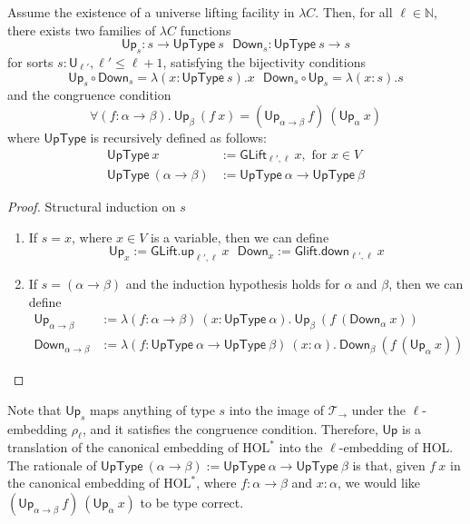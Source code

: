   \begin{theorem} Assume the existence of a universe lifting facility in $\lambda C$. Then,
    for all $\ell \in \mathbb{N}$, there exists two families of $\lambda C$ functions
    $$\mathsf{Up}_s : s \to \mathsf{UpType} \ s \ \ \ \mathsf{Down}_s : \mathsf{UpType} \ s \to s$$
    for sorts $s : \mathsf{U}_{\ell'}, \ell' \leq \ell + 1$, satisfying the bijectivity conditions
    $$\mathsf{Up}_s \circ \mathsf{Down}_s = \lambda (x : \mathsf{UpType} \ s). x \ \ \
      \mathsf{Down}_s \circ \mathsf{Up}_s = \lambda (x : s). s$$
    and the congruence condition
    $$\forall (f : \alpha \to \beta). \ \mathsf{Up}_\beta \ (f \ x) = (\mathsf{Up}_{\alpha \to \beta} \ f) \ (\mathsf{Up}_\alpha \ x)$$
    where $\mathsf{UpType}$ is recursively defined as follows:
    $$\begin{aligned}
    \mathsf{UpType} \ x & := \mathsf{GLift}_{\ell', \ell} \ x, \text{ for } x \in V \\
    \mathsf{UpType} \ (\alpha \to \beta) & := \mathsf{UpType} \ \alpha \to \mathsf{UpType} \ \beta
    \end{aligned}$$
    \begin{proof}
      Structural induction on $s$
      \begin{enumerate}
        \item If $s = x$, where $x \in V$ is a variable, then we can define
          $$\mathsf{Up}_x := \mathsf{GLift.up}_{\ell', \ell} \ x \ \ \ \mathsf{Down}_x := \mathsf{Glift.down}_{\ell', \ell} \ x$$
        \item If $s = (\alpha \to \beta)$ and the induction hypothesis holds for $\alpha$ and $\beta$, then we can define
          $$\begin{aligned}
          \mathsf{Up}_{\alpha \to \beta} &:= \lambda (f : \alpha \to \beta) \ (x : \mathsf{UpType} \ \alpha). \ \mathsf{Up}_\beta \ (f \ (\mathsf{Down}_\alpha \ x)) \\
          \mathsf{Down}_{\alpha \to \beta} &:= \lambda (f : \mathsf{UpType} \ \alpha \to \mathsf{UpType} \ \beta) \ (x : \alpha). \ \mathsf{Down}_\beta \ (f \ (\mathsf{Up}_\alpha \ x))
          \end{aligned}$$
      \end{enumerate}
    \end{proof}
  \end{theorem}

  \noindent Note that $\mathsf{Up}_s$ maps anything of type $s$ into the image of $\mathcal{T}_\to$ under
  the $\ell$-embedding $\rho_\ell$, and it satisfies the congruence condition. Therefore, $\mathsf{Up}$
  is a translation of the canonical embedding of $\text{HOL}^*$ into the $\ell$-embedding of HOL. The rationale of
  $\mathsf{UpType} \ (\alpha \to \beta) := \mathsf{UpType} \ \alpha \to \mathsf{UpType} \ \beta$
  is that, given $f \ x$ in the canonical embedding of $\text{HOL}^*$, where $f : \alpha \to \beta$ and
  $x : \alpha$, we would like $(\mathsf{Up}_{\alpha \to \beta} \ f) \ (\mathsf{Up}_\alpha \ x)$ to be type correct.